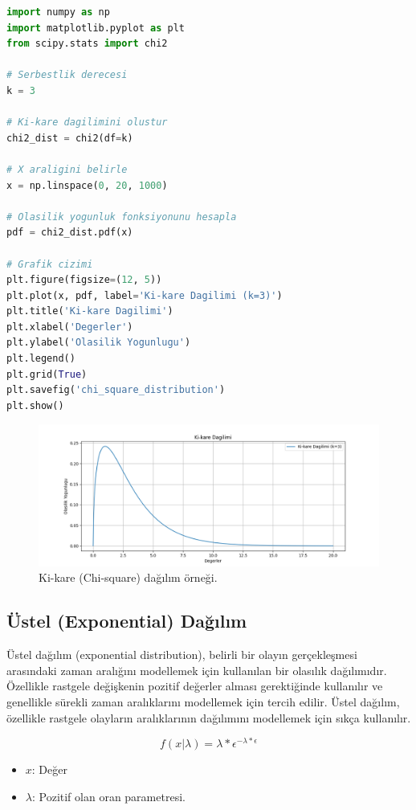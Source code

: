 \begin{lstlisting}[language=Python]
import numpy as np
import matplotlib.pyplot as plt
from scipy.stats import chi2

# Serbestlik derecesi
k = 3

# Ki-kare dagilimini olustur
chi2_dist = chi2(df=k)

# X araligini belirle
x = np.linspace(0, 20, 1000)

# Olasilik yogunluk fonksiyonunu hesapla
pdf = chi2_dist.pdf(x)

# Grafik cizimi
plt.figure(figsize=(12, 5))
plt.plot(x, pdf, label='Ki-kare Dagilimi (k=3)')
plt.title('Ki-kare Dagilimi')
plt.xlabel('Degerler')
plt.ylabel('Olasilik Yogunlugu')
plt.legend()
plt.grid(True)
plt.savefig('chi_square_distribution')
plt.show()
\end{lstlisting}

\begin{figure}[h]
    \centering
    \includegraphics[width=1\textwidth]{images/chi_square_distribution.png}
    \caption{Ki-kare (Chi-square) dağılım örneği.}
    \label{fig:enter-label}
\end{figure}

\subsection{Üstel (Exponential) Dağılım}
Üstel dağılım (exponential distribution), belirli bir olayın gerçekleşmesi arasındaki zaman aralığını modellemek için kullanılan bir olasılık dağılımıdır. Özellikle rastgele değişkenin pozitif değerler alması gerektiğinde kullanılır ve genellikle sürekli zaman aralıklarını modellemek için tercih edilir. Üstel dağılım, özellikle rastgele olayların aralıklarının dağılımını modellemek için sıkça kullanılır.

\[f(x | \lambda) = \lambda * \epsilon ^{-\lambda * \epsilon}\]
\begin{itemize}
	\item $x$: Değer
	\item $\lambda$: Pozitif olan oran parametresi.
\end{itemize}

